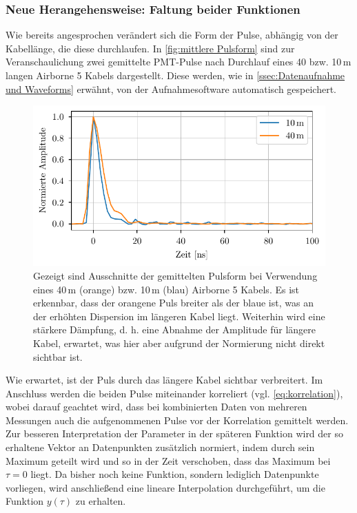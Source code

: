 \subsubsection{Neue Herangehensweise: Faltung beider Funktionen}
\label{sssec:Fitfunktion - Meine Herangehensweise}
Wie bereits angesprochen verändert sich die Form der Pulse, abhängig von der Kabellänge, die diese durchlaufen. 
In \autoref{fig:mittlere Pulsform} sind zur Veranschaulichung zwei gemittelte PMT-Pulse nach Durchlauf eines 40 bzw. 10\,m langen Airborne 5 Kabels dargestellt. 
Diese werden, wie in \autoref{ssec:Datenaufnahme und Waveforms} erwähnt, von der Aufnahmesoftware automatisch gespeichert. 
\begin{figure}[h]
    \centering
    \includegraphics{images/Analysis/mean_pulseshapes.pdf}
    \caption{Gezeigt sind Ausschnitte der gemittelten Pulsform bei Verwendung eines 40\,m (orange) bzw. 10\,m (blau) Airborne 5 Kabels. Es ist erkennbar, dass der orangene Puls breiter als der blaue ist, was an der erhöhten Dispersion im längeren Kabel liegt. Weiterhin wird eine stärkere Dämpfung, d. h. eine Abnahme der Amplitude für längere Kabel, erwartet, was hier aber aufgrund der Normierung nicht direkt sichtbar ist.}
    \label{fig:mittlere Pulsform}
\end{figure}
Wie erwartet, ist der Puls durch das längere Kabel sichtbar verbreitert. 
Im Anschluss werden die beiden Pulse miteinander korreliert (vgl. \autoref{eq:korrelation}), wobei darauf geachtet wird, dass bei kombinierten Daten von mehreren Messungen auch die aufgenommenen Pulse vor der Korrelation gemittelt werden. 
Zur besseren Interpretation der Parameter in der späteren Funktion wird der so erhaltene Vektor an Datenpunkten zusätzlich normiert, indem durch sein Maximum geteilt wird und so in der Zeit verschoben, dass das Maximum bei $\tau=0$ liegt. 
Da bisher noch keine Funktion, sondern lediglich Datenpunkte vorliegen, wird anschließend eine lineare Interpolation durchgeführt, um die Funktion $y(\tau)$ zu erhalten. 
